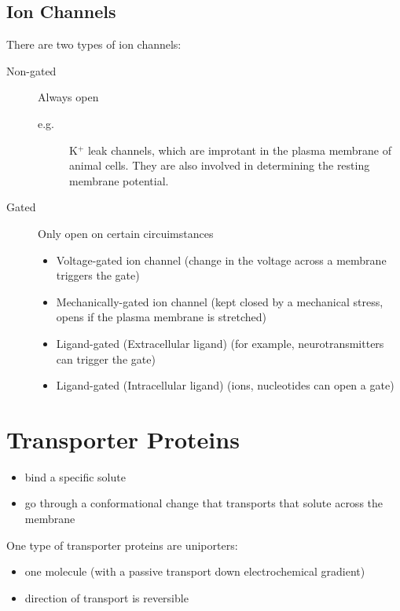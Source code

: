 \documentclass[11pt]{scrartcl}
\begin{document}
\subsection{Ion Channels}

There are two types of ion channels:

\begin{description}

\item[Non-gated] Always open

  \begin{description}

  \item[e.g.] K$^+$ leak channels, which are improtant in the plasma membrane of animal cells. They are also involved in determining the resting membrane potential.

  \end{description}
  
\item[Gated] Only open on certain circuimstances

  
\begin{itemize}
\item Voltage-gated ion channel  (change in the voltage across a membrane triggers the gate)
\item Mechanically-gated ion channel (kept closed by a mechanical stress, opens if the plasma membrane is stretched)
\item Ligand-gated (Extracellular ligand) (for example, neurotransmitters can trigger the gate)
\item Ligand-gated (Intracellular ligand) (ions, nucleotides can open a gate)
\end{itemize}
\end{description}

\section{Transporter Proteins}

\begin{itemize}
\item bind a specific solute
\item go through a conformational change that transports that solute
  across the membrane
\end{itemize}

One type of transporter proteins are uniporters:
\begin{itemize}
\item one molecule (with a passive transport down electrochemical gradient)
\item direction of transport is reversible
\end{itemize}
\end{document}
